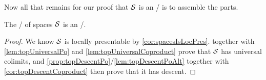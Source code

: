 Now all that remains for our proof that $\mathcal{S}$ is an \inftytop/ is to assemble the parts. 
\begin{corollary}\label{cor:spacesIsInftyTop}
    The \inftycat/ of spaces $\mathcal{S}$ is an \inftytop/.
    \begin{proof}
        We know $\mathcal{S}$ is locally presentable by \cref{cor:spacesIsLocPres}.
         together with \cref{lem:topUniversalPo} and \cref{lem:topUniversalCoproduct} prove that $\mathcal{S}$ has universal colimits, and \cref{prop:topDescentPo}/\cref{lem:topDescentPoAlt} together with \cref{cor:topDescentCoproduct} then prove that it has descent.
    \end{proof}
\end{corollary}